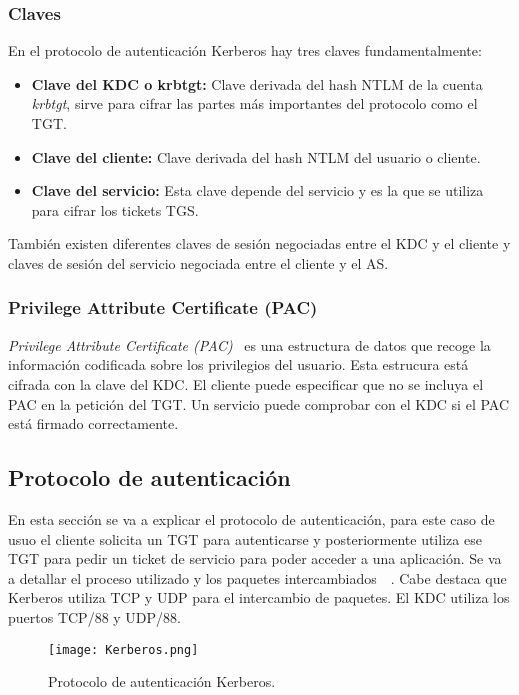 \subsubsection{Claves}

En el protocolo de autenticación Kerberos hay tres claves fundamentalmente: 
\begin{itemize}
\item \textbf{Clave del KDC o krbtgt:} Clave derivada del hash NTLM de la cuenta {\it krbtgt}, sirve para cifrar las partes más importantes del protocolo como el TGT.
\item \textbf{Clave del cliente: } Clave derivada del hash NTLM del usuario o cliente. 
\item \textbf{Clave del servicio: } Esta clave depende del servicio y es la que se utiliza para cifrar los tickets TGS. 
\end{itemize}

También existen diferentes claves de sesión negociadas entre el KDC y el cliente y claves de sesión del servicio negociada entre el cliente y el AS. 

\subsubsection{Privilege Attribute Certificate (PAC)}

{\it Privilege Attribute Certificate (PAC)}~\cite{Capitulo3:PAC} es una estructura de datos que recoge la información codificada sobre los privilegios del usuario. Esta estrucura está cifrada con la clave del KDC. El cliente puede especificar que no se incluya el PAC en la petición del TGT. Un servicio puede comprobar con el KDC si el PAC está firmado correctamente. 

\subsection{Protocolo de autenticación}

En esta sección se va a explicar el protocolo de autenticación, para este caso de usuo el cliente solicita un TGT para autenticarse y posteriormente utiliza ese TGT para pedir un ticket de servicio para poder acceder a una aplicación. Se va a detallar el proceso utilizado y los paquetes intercambiados~\cite{Capitulo3:Kerberos5}~\cite{Capitulo3:Kerberos6}. Cabe destaca que Kerberos utiliza  TCP y UDP para el intercambio de paquetes. El KDC utiliza los puertos TCP/88 y UDP/88.   

\begin{figure}[t!] %
\begin{center}
\texttt{[image: Kerberos.png]}
\end{center}
\caption{Protocolo de autenticación Kerberos.}
\label{Kerberos}
\end{figure}

